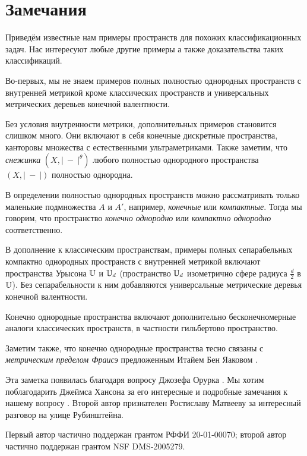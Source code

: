 \documentclass[a4paper,10pt]{article}
\begin{document}
\section{Замечания}

Приведём известные нам примеры пространств для похожих классификационных задач.
Нас интересуют любые другие примеры а также доказательства таких классификаций.

Во-первых, мы не знаем примеров полных полностью однородных пространств с внутренней метрикой кроме классических пространств и универсальных метрических деревьев конечной валентности.

Без условия внутренности метрики, дополнительных примеров становится слишком много.
Они включают в себя конечные дискретные пространства, канторовы множества с естественными ультраметриками.
Также заметим, что \emph{снежинка} $(X,|\ -\ |^\theta)$ любого полностью однородного пространства $(X,|\ -\ |)$ полностью однородна.

В определении полностью однородных пространств можно рассматривать только маленькие подмножества $A$ и $A'$,
например, \emph{конечные} или \emph{компактные}.
Тогда мы говорим, что пространство  \emph{конечно однородно} или  \emph{компактно однородно} соответственно.

В дополнение к классическим пространствам,
примеры полных сепарабельных компактно однородных пространств с внутренней метрикой включают пространства Урысона  $\mathbb{U}$ и $\mathbb{U}_d$ (пространство $\mathbb{U}_d$ изометрично сфере радиуса $\tfrac d2$ в $\mathbb{U}$).
Без сепарабельности к ним добавляются универсальные метрические деревья конечной валентности.

Конечно однородные пространства включают дополнительно бесконечномерные аналоги классических пространств,
в частности гильбертово пространство.

Заметим также, что конечно однородные пространства тесно связаны с \emph{метрическим пределом Фраисэ} предложенным Итайем Бен Яаковом \cite{ben-yaacov}. 

Эта заметка появилась благодаря вопросу Джозефа Орурка \cite{rourke}.
Мы хотим поблагодарить Джеймса Хансона за его интересные и подробные замечания к нашему вопросу \cite{hanson}.
Второй автор признателен Ростиславу Матвееву за интересный разговор на улице Рубинштейна.

Первый автор частично поддержан грантом РФФИ 20-01-00070;
второй автор частично поддержан грантом NSF DMS-2005279.

{\sloppy
\printbibliography[heading=bibintoc]
\fussy
}
\end{document}

